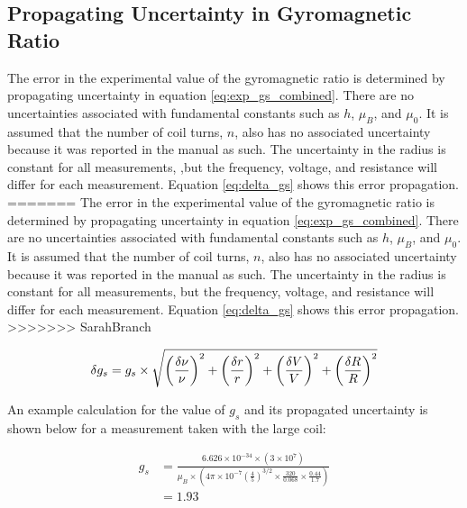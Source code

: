 \documentclass[a4paper]{article}
\begin{document}
\subsection{Propagating Uncertainty in Gyromagnetic Ratio}
\qq The error in the experimental value of the gyromagnetic ratio is
determined by propagating uncertainty in equation
\ref{eq:exp_gs_combined}. There are no uncertainties associated with
fundamental constants such as $h$, $\mu_B$, and $\mu_0$. It is assumed
that the number of coil turns, $n$, also has no associated uncertainty
because it was reported in the manual as such. The uncertainty in the
radius is constant for all measurements, ,but the frequency, voltage,
and resistance will differ for each measurement. Equation
\ref{eq:delta_gs} shows this error propagation.
=======
\qq The error in the experimental value of the gyromagnetic ratio is determined by propagating uncertainty in equation \ref{eq:exp_gs_combined}. There are no uncertainties associated with fundamental constants such as $h$, $\mu_B$, and $\mu_0$. It is assumed that the number of coil turns, $n$, also has no associated uncertainty because it was reported in the manual as such. The uncertainty in the radius is constant for all measurements, but the frequency, voltage, and resistance will differ for each measurement. Equation \ref{eq:delta_gs} shows this error propagation.
>>>>>>> SarahBranch

\begin{equation}
\label{eq:delta_gs}
\delta g_s = g_s \times
              \sqrt {
              		  \left( \frac{\delta \nu}{\nu} \right) ^2
              		+ \left( \frac{\delta r}{r} \right) ^2
              		+ \left( \frac{\delta V}{V} \right) ^2
              		+ \left( \frac{\delta R}{R} \right) ^2
					} \\
\end{equation}

An example calculation for the value of $g_s$ and its propagated
uncertainty is shown below for a measurement taken with the large
coil:

\begin{align*}
g_s &= \frac
		{6.626 \times 10^{-34} \times  \left( 3 \times 10^7 \right) }
		{\mu_B \times \left( 4 \pi \times 10^{-7}
						     \left( \frac{4}{5} \right) ^{3/2}
						     \times \frac{320}{0.068}
						     \times \frac{0.44}{1.7} \right)
	     } \\
    &= 1.93 \\
\end{align*}
\end{document}
